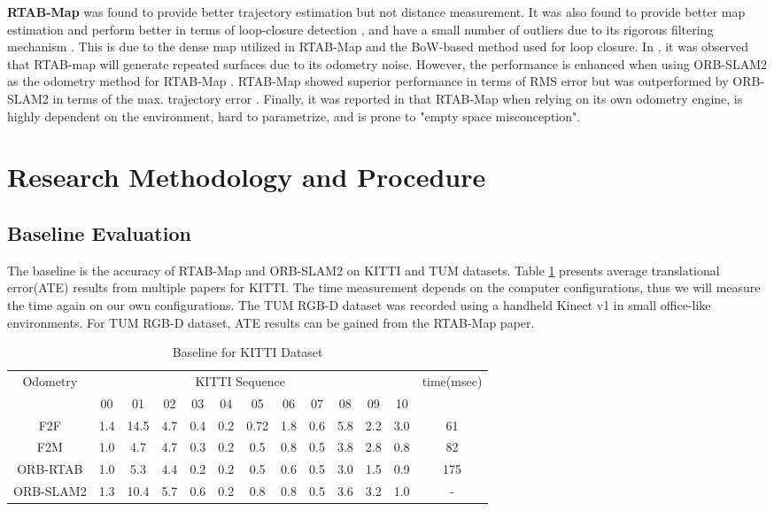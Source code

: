 \documentclass[12pt]{article}
\begin{document}
\indent\textbf{RTAB-Map} was found to provide better trajectory estimation but not distance measurement. It was also found to provide better map estimation and perform better in terms of loop-closure detection \cite{8806213}, and have a small number of outliers due to its rigorous filtering mechanism \cite{8250081}. This is due to the dense map utilized in RTAB-Map and the BoW-based method used for loop closure. In \cite{8250081}, it was observed that RTAB-map will generate repeated surfaces due to its odometry noise. However, the performance is enhanced when using ORB-SLAM2 as the odometry method for RTAB-Map \cite{labbe2019rtab}. RTAB-Map showed superior performance in terms of RMS error but was outperformed by ORB-SLAM2 in terms of the max. trajectory error \cite{8710464}. Finally, it was reported in \cite{study2018} that RTAB-Map when relying on its own odometry engine, is highly dependent on the environment, hard to parametrize, and is prone to "empty space misconception".  
\section{Research Methodology and Procedure}
\subsection{Baseline Evaluation}
The baseline is the accuracy of RTAB-Map and ORB-SLAM2 on KITTI and TUM datasets. Table \ref{tab:my-table} presents average translational error(ATE) results from multiple papers for KITTI\cite{labbe2019rtab}. The time measurement depends on the computer configurations, thus we will measure the time again on our own configurations. The TUM RGB-D dataset was recorded using a handheld Kinect v1 in small office-like environments\cite{sturm2012benchmark}. For TUM RGB-D dataset, ATE results can be gained from the RTAB-Map paper\cite{labbe2019rtab}.
\begin{table}[]
    \centering
    \begin{tabular}{@{}ccccccccccccc@{}}
    \toprule
    Odometry  & \multicolumn{10}{c}{KITTI Sequence}                         &     & time(msec)   \\
              & 00  & 01   & 02  & 03  & 04  & 05   & 06  & 07  & 08  & 09  & 10  &     \\ \midrule
    F2F       & 1.4 & 14.5 & 4.7 & 0.4 & 0.2 & 0.72 & 1.8 & 0.6 & 5.8 & 2.2 & 3.0 & 61  \\ \midrule
    F2M       & 1.0 & 4.7  & 4.7 & 0.3 & 0.2 & 0.5  & 0.8 & 0.5 & 3.8 & 2.8 & 0.8 & 82  \\ \midrule
    ORB-RTAB  & 1.0 & 5.3  & 4.4 & 0.2 & 0.2 & 0.5  & 0.6 & 0.5 & 3.0 & 1.5 & 0.9 & 175 \\ \midrule
    ORB-SLAM2 & 1.3 & 10.4 & 5.7 & 0.6 & 0.2 & 0.8  & 0.8 & 0.5 & 3.6 & 3.2 & 1.0 & -   \\ \bottomrule
    \end{tabular}
    \caption{Baseline for KITTI Dataset}
    \label{tab:my-table}
    \end{table}
\end{document}
